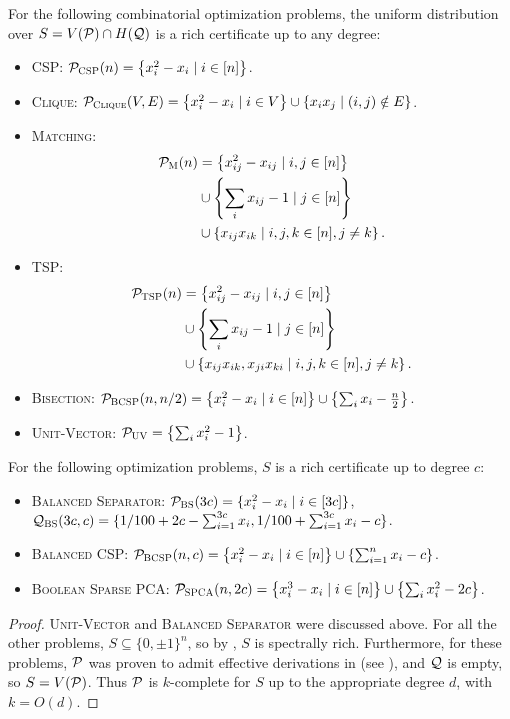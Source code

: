 \begin{corollary}\label{cor:examples}
For the following combinatorial optimization problems, the uniform distribution over $S = V(\cP) \cap H(\cQ)$ is a rich certificate up to any degree:
\begin{itemize}
\item \textsc{CSP}: $\pcsp(n) = \csp$. 
\item \textsc{Clique}: $\pclique(V,E) = \clique$.
\item \textsc{Matching}: 
\begin{align*}
\pmatch(n) &= \alignmatching.
\end{align*}
\item \textsc{TSP}:
\begin{align*}
\ptsp(n) &= \aligntsp.
\end{align*}
\item \textsc{Bisection}: $\pbcsp(n,n/2) = \bisec$.
\item \textsc{Unit-Vector}: $\cP_{\textsc{UV}} = \left\{\sum_i x_i^2 - 1\right\}$.
\end{itemize}
For the following optimization problems, $S$ is a rich certificate up to degree $c$:
\begin{itemize}
\item \textsc{Balanced Separator}: $\cP_{\textsc{BS}}(3c) = \{x_i^2 - x_i \mid i \in [3c]\}$, $\cQ_{\textsc{BS}}(3c,c) = \{1/100 + 2c - \sum_{i=1}^{3c} x_i, 1/100 + \sum_{i=1}^{3c} x_i - c\}$.
\item \textsc{Balanced CSP}: $\pbcsp(n,c) = \bcsp{n}{c}$.
\item \textsc{Boolean Sparse PCA}: $\pspca(n,2c) = \bspca{n}{2c}$.
\end{itemize}
\end{corollary}
\begin{proof}
\textsc{Unit-Vector} and \textsc{Balanced Separator} were discussed above. For all the other problems, $S \subseteq \{0,\pm 1\}^n$, so by , $S$ is spectrally rich. Furthermore, for these problems, $\cP$ was proven to admit effective derivations in  (see ), and $\cQ$ is empty, so $S = V(\cP)$. Thus $\cP$ is $k$-complete for $S$ up to the appropriate degree $d$, with $k = O(d)$. 
\end{proof}

